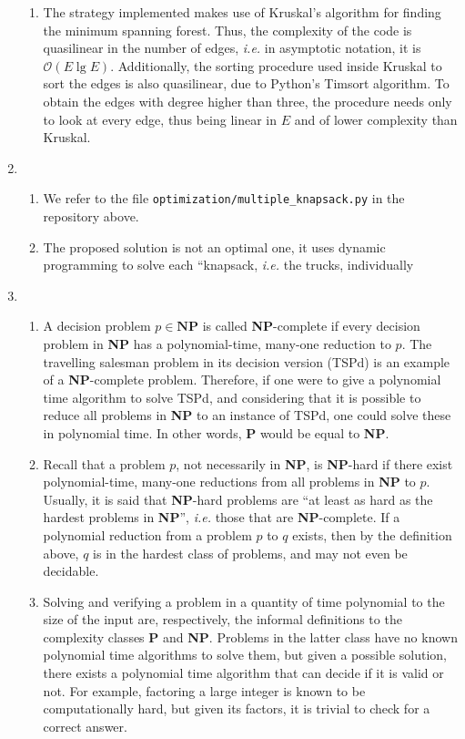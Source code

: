 \documentclass[12pt]{article}
\begin{document}
\begin{enumerate}
\begin{enumerate}
    \item The strategy implemented makes use of Kruskal's algorithm for finding the minimum spanning forest. Thus, the complexity of the code is quasilinear in the number of edges, \emph{i.e.} in asymptotic notation, it is $\mathcal{O}(E \lg E)$. Additionally, the sorting procedure used inside Kruskal to sort the edges is also quasilinear, due to Python's Timsort algorithm. To obtain the edges with degree higher than three, the procedure needs only to look at every edge, thus being linear in $E$ and of lower complexity than Kruskal.
  \end{enumerate}
  \item
  \begin{enumerate}
    \item We refer to the file \texttt{optimization/multiple\_knapsack.py} in the repository above.
    \item The proposed solution is not an optimal one, it uses dynamic programming to solve each ``knapsack, \textit{i.e.} the trucks, individually 
  \end{enumerate}
  \item 
  \begin{enumerate}
    \item A decision problem $p \in \mathbf{NP}$ is called \textbf{NP}-complete if every decision problem in \textbf{NP} has a polynomial-time, many-one reduction to $p$. The travelling salesman problem in its decision version (TSPd) is an example of a \textbf{NP}-complete problem. Therefore, if one were to give a polynomial time algorithm to solve TSPd, and considering that it is possible to reduce all problems in \textbf{NP} to an instance of TSPd, one could solve these in polynomial time. In other words, \textbf{P} would be equal to \textbf{NP}.
    \item Recall that a problem $p$, not necessarily in \textbf{NP}, is \textbf{NP}-hard if there exist polynomial-time, many-one reductions from all problems in \textbf{NP} to $p$. Usually, it is said that \textbf{NP}-hard problems are ``at least as hard as the hardest problems in \textbf{NP}'', \emph{i.e.} those that are \textbf{NP}-complete. If a polynomial reduction from a problem $p$ to $q  $ exists, then by the definition above, $q$ is in the hardest class of problems, and may not even be decidable.
    \item Solving and verifying a problem in a quantity of time polynomial to the size of the input are, respectively, the informal definitions to the complexity classes \textbf{P} and \textbf{NP}. Problems in the latter class have no known polynomial time algorithms to solve them, but given a possible solution, there exists a polynomial time algorithm that can decide if it is valid or not. For example, factoring a large integer is known to be computationally hard, but given its factors, it is trivial to check for a correct answer.

\end{enumerate}
\end{enumerate}
\end{document}
